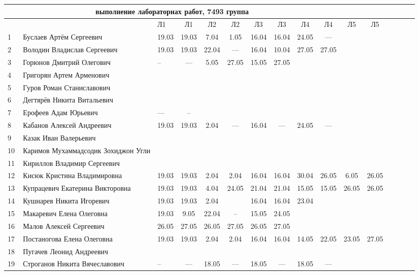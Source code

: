 \documentclass[a4paper,11pt]{article}
\begin{document}
%
\hspace{-6.1cm} %
\begin{tabular}{l|llccccccccccccc}
\multicolumn{10}{c}{выполнение лабораторнах работ, 7493 группа} \\
\toprule
&&Л1&Л1& Л2&Л2& Л3&Л3& Л4&Л4& Л5&Л5\\ 
\midrule
1\,&Буслаев Артём Сергеевич               &19.03&19.03& 7.04& 1.05&16.04&16.04&24.05& --- &&\\
2\,&Володин Владислав Сергеевич           &19.03&19.03&22.04& --- &16.04&10.04&27.05&27.05\\
3\,&Горюнов Дмитрий Олегович              &--   &---  & 5.05&27.05&15.05&27.05&&\\
4\,&Григорян Артем Арменович              &&&&&&&&\\
5\,&Гуров Роман Станиславович             &&&&&&&&\\
\midrule
6\,&Дегтярёв Никита Витальевич            &&&&&&&&\\
7\,&Ерофеев Адам Юрьевич                  &---&--&&&&&&\\
8\,&Кабанов Алексей Андреевич             &19.03&19.03&2.04& --- &16.04& --- &24.05& ---\\
9\,&Казак Иван Валерьевич                 &&&&&&&&\\
10\,&Каримов Мухаммадсодик Зохиджон Угли  &&&&&&&&\\
\midrule
11\,&Кириллов Владимир Сергеевич          &&&&&&&&\\
12\,&Кисюк Кристина Владимировна          &19.03&19.03&2.04 &2.04&16.04&16.04 &30.04&26.05&6.05&26.05\\
13\,&Купрацевич Екатерина Викторовна      &19.03&19.03& 4.04&24.05&21.04&21.04&15.05&15.05&26.05&26.05\\
14\,&Кушнарев Никита Игоревич             &19.03&19.03& 2.04&     &16.04&16.04&23.04&\\
15\,&Макаревич Елена Олеговна             &19.03& 9.05&22.04& --  &15.05&24.05&&\\
\midrule
16\,&Малов Алексей Сергеевич              &26.05&27.05&26.05&27.05&26.05&27.05&&\\
17\,&Постаногова Елена Олеговна           &19.03&19.03&2.04&2.04&16.04&16.04&14.05&22.05&23.05&27.05\\
18\,&Пугачев Леонид Андреевич             &&&&&&&&\\
19\,&Строганов Никита Вячеславович        &--&---&18.05& --- &18.05& --- &18.05& ---\\

\bottomrule
\end{tabular}
\end{document}

